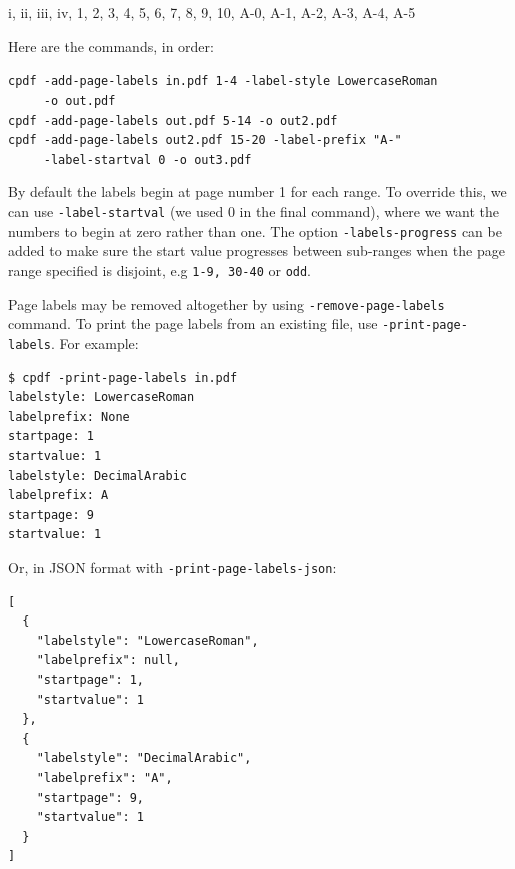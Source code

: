 \documentclass{book}
\begin{document}
\vspace{4mm}
i, ii, iii, iv, 1, 2, 3, 4, 5, 6, 7, 8, 9, 10, A-0, A-1, A-2, A-3, A-4, A-5
\vspace{4mm}

\noindent Here are the commands, in order:

{\small\begin{framed}
  \noindent\verb!cpdf -add-page-labels in.pdf 1-4 -label-style LowercaseRoman!\\
  \noindent\verb!     -o out.pdf!\\
  
  \noindent\verb!cpdf -add-page-labels out.pdf 5-14 -o out2.pdf!\\

  \noindent\verb!cpdf -add-page-labels out2.pdf 15-20 -label-prefix "A-"!\\
  \noindent\verb!     -label-startval 0 -o out3.pdf!
\end{framed}}

\noindent By default the labels begin at page number 1 for each range. To override this, we can use \texttt{-label-startval} (we used $0$ in the final command), where we want the numbers to begin at zero rather than one. The option \texttt{-labels-progress} can be added to make sure the  start value progresses between sub-ranges when the page range specified is disjoint, e.g \texttt{1-9, 30-40} or \texttt{odd}.

Page labels may be removed altogether by using \texttt{-remove-page-labels} command. To print the page labels from an existing file, use \texttt{-print-page-labels}. For example:

\begin{framed}\small\begin{verbatim}
$ cpdf -print-page-labels in.pdf
labelstyle: LowercaseRoman
labelprefix: None
startpage: 1
startvalue: 1
labelstyle: DecimalArabic
labelprefix: A
startpage: 9
startvalue: 1
\end{verbatim}
\end{framed}\pagestyle{empty}\thispagestyle{fancy}

\noindent Or, in JSON format with \texttt{-print-page-labels-json}:

\begin{framed}\small\begin{verbatim}[
  {
    "labelstyle": "LowercaseRoman",
    "labelprefix": null,
    "startpage": 1,
    "startvalue": 1
  },
  {
    "labelstyle": "DecimalArabic",
    "labelprefix": "A",
    "startpage": 9,
    "startvalue": 1
  }
]
\end{verbatim}
\end{framed}\pagestyle{empty}
\end{document}
